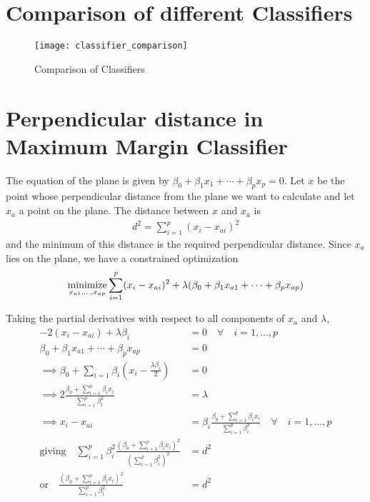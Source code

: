 \documentclass[../statistical_learning_notes.tex]{subfiles}
\begin{document}
\section{Comparison of different Classifiers}
\begin{figure}[h]
    \texttt{[image: classifier\_comparison]}
    \centering
    \caption {Comparison of Classifiers}
    \label{fig:classifier_comparison} %
\end{figure}


\section{Perpendicular distance in Maximum Margin Classifier}\label{sec:appendix_mmc_perpendicular_dist}
The equation of the plane is given by $\beta_{0} + \beta_{1}x_{1} + \cdots + \beta_{p}x_{p} = 0$. Let $x$ be the point whose perpendicular distance from the plane we want to calculate and let $x_{a}$ a point on the plane. The distance between $x$ and $x_{a}$ is
\begin{align*}
    d^{2} = \sum_{i=1}^{p} (x_{i} - x_{ai})^{2}
\end{align*}
and the minimum of this distance is the required perpendicular distance. Since $x_{a}$ lies on the plane, we have a constrained optimization
\begin{align*}
    \operatorname*{minimize}_{x_{a1}, \ldots, x_{ap}} \sum_{i=1}^{p} (x_{i} - x_{ai})^{2} + \lambda (\beta_{0} + \beta_{1}x_{a1} + \cdots + \beta_{p}x_{ap})
\end{align*}

Taking the partial derivatives with respect to all components of $x_{a}$ and $\lambda$,
\begin{align*}
    -2(x_{i} - x_{ai}) + \lambda \beta_{i} &= 0 \quad \forall \quad i = 1, \ldots, p\\
    \beta_{0} + \beta_{1}x_{a1} + \cdots + \beta_{p}x_{ap} &= 0\\
    \implies \beta_{0} + \sum_{i=1} \beta_{i}(x_{i} - \frac{\lambda \beta_{i}}{2}) &= 0\\
    \implies 2\frac{\beta_{0} + \sum_{i=1}^{p} \beta_{i}x_{i}}{\sum_{i=1}^{p}\beta_{i}^{2}} &= \lambda\\
    \implies x_{i} - x_{ai} &= \beta_{i} \frac{\beta_{0} + \sum_{i=1}^{p} \beta_{i}x_{i}}{\sum_{i=1}^{p}\beta_{i}^{2}} \quad \forall \quad i = 1, \ldots, p\\
    \text{giving} \quad \sum_{i=1}^{p} \beta_{i}^{2} \frac{(\beta_{0} + \sum_{i=1}^{p} \beta_{i}x_{i})^{2}}{(\sum_{i=1}^{p}\beta_{i}^{2})^{2}} &= d^{2}\\
    \text{or} \quad \frac{(\beta_{0} + \sum_{i=1}^{p} \beta_{i}x_{i})^{2}}{\sum_{i=1}^{p}\beta_{i}^{2}} &= d^{2}
\end{align*}
\end{document}
